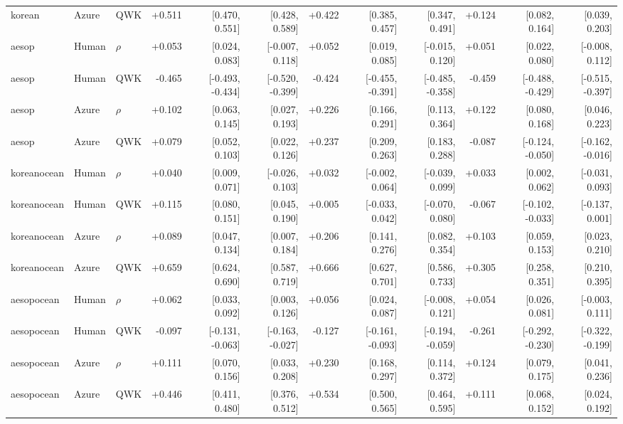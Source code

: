 \documentclass[10pt]{article}
\begin{document}
\begin{landscape}
\begin{longtable}{@{}lllrrrrrrrrr@{}}
korean & Azure & QWK & +0.511 & [0.470, 0.551] & [0.428, 0.589] & +0.422 & [0.385, 0.457] & [0.347, 0.491] & +0.124 & [0.082, 0.164] & [0.039, 0.203]\\
\addlinespace[2pt]
aesop & Human & $\rho$ & +0.053 & [0.024, 0.083] & [-0.007, 0.118] & +0.052 & [0.019, 0.085] & [-0.015, 0.120] & +0.051 & [0.022, 0.080] & [-0.008, 0.112]\\
aesop & Human & QWK & -0.465 & [-0.493, -0.434] & [-0.520, -0.399] & -0.424 & [-0.455, -0.391] & [-0.485, -0.358] & -0.459 & [-0.488, -0.429] & [-0.515, -0.397]\\
aesop & Azure & $\rho$ & +0.102 & [0.063, 0.145] & [0.027, 0.193] & +0.226 & [0.166, 0.291] & [0.113, 0.364] & +0.122 & [0.080, 0.168] & [0.046, 0.223]\\
aesop & Azure & QWK & +0.079 & [0.052, 0.103] & [0.022, 0.126] & +0.237 & [0.209, 0.263] & [0.183, 0.288] & -0.087 & [-0.124, -0.050] & [-0.162, -0.016]\\
\addlinespace[2pt]
koreanocean & Human & $\rho$ & +0.040 & [0.009, 0.071] & [-0.026, 0.103] & +0.032 & [-0.002, 0.064] & [-0.039, 0.099] & +0.033 & [0.002, 0.062] & [-0.031, 0.093]\\
koreanocean & Human & QWK & +0.115 & [0.080, 0.151] & [0.045, 0.190] & +0.005 & [-0.033, 0.042] & [-0.070, 0.080] & -0.067 & [-0.102, -0.033] & [-0.137, 0.001]\\
koreanocean & Azure & $\rho$ & +0.089 & [0.047, 0.134] & [0.007, 0.184] & +0.206 & [0.141, 0.276] & [0.082, 0.354] & +0.103 & [0.059, 0.153] & [0.023, 0.210]\\
koreanocean & Azure & QWK & +0.659 & [0.624, 0.690] & [0.587, 0.719] & +0.666 & [0.627, 0.701] & [0.586, 0.733] & +0.305 & [0.258, 0.351] & [0.210, 0.395]\\
\addlinespace[2pt]
aesopocean & Human & $\rho$ & +0.062 & [0.033, 0.092] & [0.003, 0.126] & +0.056 & [0.024, 0.087] & [-0.008, 0.121] & +0.054 & [0.026, 0.081] & [-0.003, 0.111]\\
aesopocean & Human & QWK & -0.097 & [-0.131, -0.063] & [-0.163, -0.027] & -0.127 & [-0.161, -0.093] & [-0.194, -0.059] & -0.261 & [-0.292, -0.230] & [-0.322, -0.199]\\
aesopocean & Azure & $\rho$ & +0.111 & [0.070, 0.156] & [0.033, 0.208] & +0.230 & [0.168, 0.297] & [0.114, 0.372] & +0.124 & [0.079, 0.175] & [0.041, 0.236]\\
aesopocean & Azure & QWK & +0.446 & [0.411, 0.480] & [0.376, 0.512] & +0.534 & [0.500, 0.565] & [0.464, 0.595] & +0.111 & [0.068, 0.152] & [0.024, 0.192]\\

\end{longtable}
\end{landscape}
\end{document}
